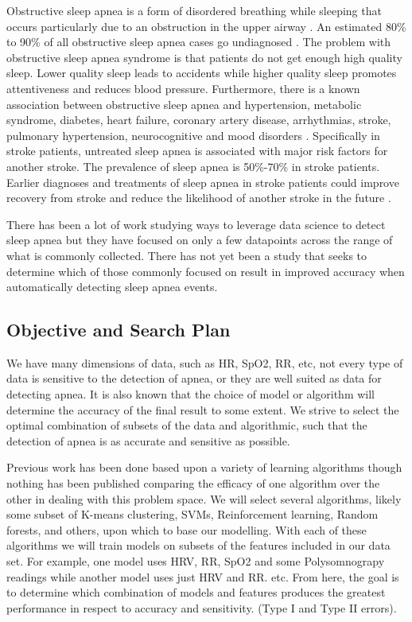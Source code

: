\documentclass[acmsmall]{acmart}
\begin{document}
Obstructive sleep apnea is a form of disordered breathing while sleeping that occurs particularly due to an obstruction in the upper airway \cite{davis2013early}. An estimated 80\% to 90\% of all obstructive sleep apnea cases go undiagnosed \cite{silverberg2002treating}. The problem with obstructive sleep apnea syndrome is that patients do not get enough high quality sleep. Lower quality sleep leads to accidents while higher quality sleep promotes attentiveness and reduces blood pressure. Furthermore, there is a known association between obstructive sleep apnea and hypertension, metabolic syndrome, diabetes, heart failure, coronary artery disease, arrhythmias, stroke, pulmonary hypertension, neurocognitive and mood disorders \cite{mannarino2012obstructive}. Specifically in stroke patients, untreated sleep apnea is associated with major risk factors for another stroke. The prevalence of sleep apnea is 50\%-70\% in stroke patients. Earlier diagnoses and treatments of sleep apnea in stroke patients could improve recovery from stroke and reduce the likelihood of another stroke in the future \cite{davis2013early}. 

There has been a lot of work studying ways to leverage data science to detect sleep apnea but they have focused on only a few datapoints across the range of what is commonly collected. There has not yet been a study that seeks to determine which of those commonly focused on result in improved accuracy when automatically detecting sleep apnea events.


\subsection{Objective and Search Plan}

We have many dimensions of data, such as HR, SpO2, RR, etc, not every type of data is sensitive to the detection of apnea, or they are well suited as data for detecting apnea. It is also known that the choice of model or algorithm will determine the accuracy of the final result to some extent. We strive to select the optimal combination of subsets of the data and algorithmic, such that the detection of apnea is as accurate and sensitive as possible. 

Previous work has been done based upon a variety of learning algorithms though nothing has been published comparing the efficacy of one algorithm over the other in dealing with this problem space. We will select several algorithms, likely some subset of K-means clustering, SVMs, Reinforcement learning, Random forests, and others, upon which to base our modelling. With each of these algorithms we will train models on subsets of the features included in our data set. For example, one model uses HRV, RR, SpO2 and some Polysomnograpy readings while another model uses just HRV and RR. etc. From here, the goal is to determine which combination of models and features produces the greatest performance in respect to accuracy and sensitivity. (Type I and Type II errors).
\end{document}

